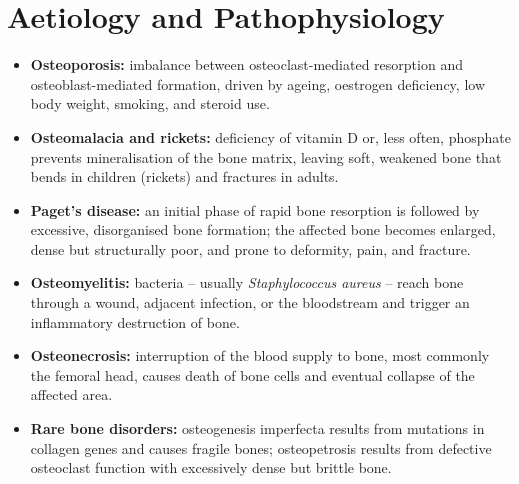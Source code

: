\section*{Aetiology and Pathophysiology}
\begin{itemize}
    \item \textbf{Osteoporosis:} imbalance between osteoclast-mediated resorption and osteoblast-mediated formation, driven by ageing, oestrogen deficiency, low body weight, smoking, and steroid use.
    \item \textbf{Osteomalacia and rickets:} deficiency of vitamin D or, less often, phosphate prevents mineralisation of the bone matrix, leaving soft, weakened bone that bends in children (rickets) and fractures in adults.
    \item \textbf{Paget's disease:} an initial phase of rapid bone resorption is followed by excessive, disorganised bone formation; the affected bone becomes enlarged, dense but structurally poor, and prone to deformity, pain, and fracture.
    \item \textbf{Osteomyelitis:} bacteria -- usually \textit{Staphylococcus aureus} -- reach bone through a wound, adjacent infection, or the bloodstream and trigger an inflammatory destruction of bone.
    \item \textbf{Osteonecrosis:} interruption of the blood supply to bone, most commonly the femoral head, causes death of bone cells and eventual collapse of the affected area.
    \item \textbf{Rare bone disorders:} osteogenesis imperfecta results from mutations in collagen genes and causes fragile bones; osteopetrosis results from defective osteoclast function with excessively dense but brittle bone.
\end{itemize}

